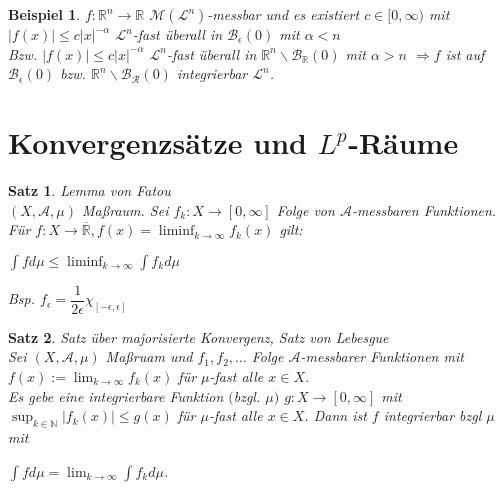 \documentclass[11pt]{memoir}
\theoremstyle{changebreak}
\newtheorem{Beispiel}{Beispiel}[chapter]
\newtheorem{Satz}{Satz}[chapter]
\begin{document}
\begin{Beispiel}
$f: \mathbb R^n \rightarrow \mathbb R$ $\mathscr M(\mathscr L^n)$-messbar und es existiert $c \in [0, \infty)$ mit $|f(x)| \leq c|x|^{-\alpha}$ $\mathscr L^n$-fast überall in $\mathscr B_\epsilon (0)$ mit $\alpha < n$ \\
Bzw. $|f(x)| \leq c|x|^{-\alpha}$ $\mathscr L^n$-fast überall in $\mathbb R^n \backslash \mathscr B_\mathbb R (0)$ mit $\alpha > n$ $\Rightarrow f$ ist auf $\mathscr B_\epsilon (0)$ bzw. $\mathbb R^n \backslash \mathscr B_\mathscr R (0)$ integrierbar $\mathscr L^n$.
\end{Beispiel}


\section{Konvergenzsätze und $L^p$-Räume}

\begin{Satz}
\emph{Lemma von Fatou} \\
$(X, \mathscr A, \mu)$ Maßraum. Sei $f_k: X \rightarrow [0, \infty]$ Folge von $\mathscr A$-messbaren Funktionen. Für $f: X \rightarrow \overline{\mathbb R}, f(x) = \liminf_{k \rightarrow \infty} f_k (x)$ gilt: \\
\begin{center}
$\int f d\mu \leq \liminf_{k \rightarrow \infty} \int f_k d\mu$
\end{center}

Bsp. $f_\epsilon = \dfrac{1}{2\epsilon} \chi_{[-\epsilon, \epsilon]}$
\end{Satz}

\begin{Satz}
\emph{Satz über majorisierte Konvergenz, Satz von Lebesgue} \\
Sei $(X, \mathscr A, \mu)$ Maßruam und $f_1, f_2, ...$ Folge $\mathscr A$-messbarer Funktionen mit \\$f(x) := \lim_{k \rightarrow \infty} f_k (x)$ für $\mu$-fast alle $x \in X$. \\
Es gebe eine integrierbare Funktion $($bzgl. $\mu)$ $g: X \rightarrow [0, \infty]$ mit \\
$\sup_{k \in \mathbb N} |f_k (x)| \leq g(x)$ für $\mu$-fast alle $x \in X$. Dann ist $f$ integrierbar bzgl $\mu$ mit
\begin{center}
$\int f d\mu = \lim_{k \rightarrow \infty} \int f_k d\mu$.
\end{center}
\end{Satz}
\end{document}
